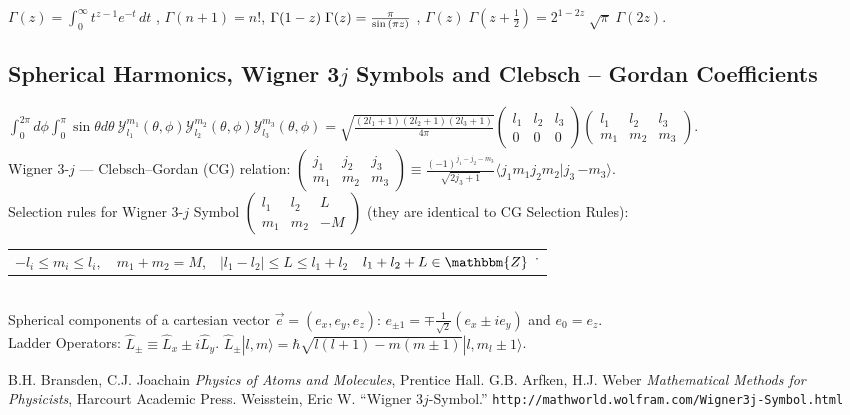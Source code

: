 \documentclass[10.5pt,letterpaper]{article}
\begin{document}
\noindent $\Gamma(z) = \int_0^\infty  t^{z-1} e^{-t}\,dt $ \space , \space $\Gamma(n+1)=n!$\space , \space $ \Gamma(1-z) \; \Gamma(z) = {\pi \over \sin{(\pi z)}} \,\! $ \space , \space  $\Gamma(z) \; \Gamma\left(z + \frac{1}{2}\right) = 2^{1-2z} \; \sqrt{\pi} \; \Gamma(2z). \,\! $


\subsection*{Spherical Harmonics, Wigner 3$j$ Symbols and Clebsch -- Gordan Coefficients}
$\int_0^{2 \pi} d\phi \int_0^{\pi} \sin \theta d\theta \ \mathcal{Y}_{l_1}^{m_1}(\theta,\phi) \mathcal{Y}_{l_2}^{m_2}(\theta,\phi) \mathcal{Y}_{l_3}^{m_3}(\theta,\phi)=\sqrt{\frac{(2l_1+1)(2l_2+1)(2l_3+1)}{4 \pi}} \begin{pmatrix}
  l_1 & l_2 & l_3\\
  0 & 0 & 0
\end{pmatrix}
\begin{pmatrix}
  l_1 & l_2 & l_3\\
  m_1 & m_2 & m_3
\end{pmatrix}
$.
\\

\noindent Wigner 3-$j$ --- Clebsch--Gordan (CG) relation:
$
\begin{pmatrix}
  j_1 & j_2 & j_3\\
  m_1 & m_2 & m_3
\end{pmatrix}
\equiv \frac{(-1)^{j_1-j_2-m_3}}{\sqrt{2j_3+1}} \langle j_1 m_1 j_2 m_2 | j_3 \, {-m_3} \rangle.$\\

\noindent Selection rules for Wigner 3-$j$ Symbol $\begin{pmatrix}  l_1 & l_2 & L\\   m_1 & m_2 & -M \end{pmatrix}$ (they are identical to CG Selection Rules):

\noindent 
\begin{tabular}{llll}
$-l_i \leq m_i \leq l_i, $ & $m_1+m_2=M$, & $|l_1-l_2|\leqslant L \leqslant l_1+l_2$ & $l_1+l_2+L \in \mathbbm{Z}$  \.\ 
\end{tabular}
\\

\noindent Spherical components of a cartesian vector $\vec e=(e_x,e_y,e_z)$: $e_{\pm 1}=\mp \frac{1}{\sqrt{2}} \left( e_x\pm i e_y \right)$ and $e_0=e_z$.\\

\noindent Ladder Operators: $ \hat L_{\pm}\equiv \hat L_x\pm i \hat L_y$. \space \space \space $\hat L_{\pm} |l,m \rangle=\hbar \sqrt{l(l+1)-m(m\pm1)}|l,m_l\pm1 \rangle$.
\begin{thebibliography}{}
\bibitem{} B.H. Bransden, C.J. Joachain \textit{Physics of Atoms and Molecules}, Prentice Hall.
\bibitem{} G.B. Arfken, H.J. Weber \textit{Mathematical Methods for Physicists}, Harcourt Academic Press.
\bibitem{} Weisstein, Eric W. ``Wigner 3$j$-Symbol.'' \verb|http://mathworld.wolfram.com/Wigner3j-Symbol.html|
\end{thebibliography}
\end{document}
